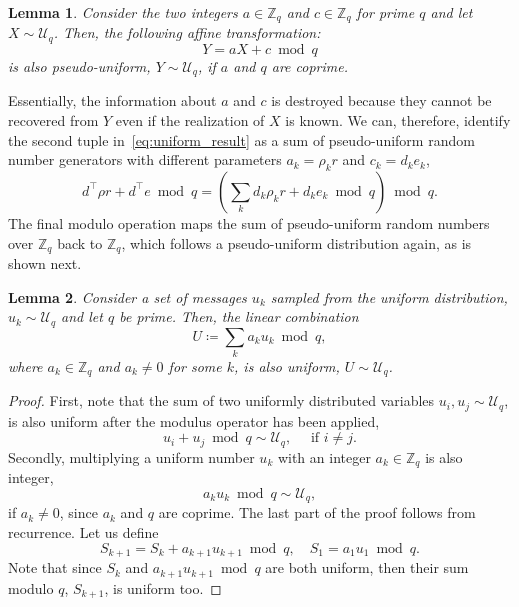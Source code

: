 \documentclass[journal, twoside, web]{ieeecolorpreprint}
\newtheorem{lem}{Lemma}
\begin{document}
\begin{lem}\label{lem:makeUnif}
    Consider the two integers $a\in\mathbb Z_q$ and $c \in \mathbb Z_q$ for prime $q$ and let $X \sim \mathcal{U}_q$. Then, the following affine transformation:
    \begin{equation} \label{eq:uniformize}
        Y= aX+c \bmod q
    \end{equation}
    is also pseudo-uniform, $Y \sim \mathcal{U}_{q}$, if $a$ and $q$ are coprime.
\end{lem}

Essentially, the information about $a$ and $c$ is destroyed because they cannot be recovered from $Y$ even if the realization of $X$ is known. We can, therefore, identify the second tuple in~\eqref{eq:uniform_result} as a sum of pseudo-uniform random number generators with different parameters $a_k=\rho_kr$ and $c_k=d_ke_k$,
\begin{equation*}
   d^\top \rho r + d^\top e \bmod q =  \left ( \sum \limits_k d_k\rho_kr + d_ke_k \bmod q \right) \bmod q.
\end{equation*}
The final modulo operation maps the sum of pseudo-uniform random numbers over $\mathbb Z_q$ back to $\mathbb Z_q$, which follows a pseudo-uniform distribution again, as is shown next.
\begin{lem}
\label{lem:sum_pseudo_unif}    Consider a set of messages $u_k$ sampled from the uniform distribution, $u_k \sim \mathcal{U}_{q}$ and let $q$ be prime. Then, the linear combination
    \begin{equation*}
        U \coloneqq \sum \limits_k a_k u_k \bmod q,
    \end{equation*}
    where $a_k \in \mathbb Z_q$ and $a_k \neq 0$ for some $k$, is also uniform, $U \sim  \mathcal{U}_{q}$.
\end{lem}
\begin{proof}
    First, note that the sum of two uniformly distributed variables $u_i, u_j \sim  \mathcal{U}_{q}$, is also uniform after the modulus operator has been applied,
    \begin{equation*}
        u_i+u_j \bmod q \sim  \mathcal{U}_{q}, \quad \text{ if } i\neq j.
    \end{equation*}
    Secondly, multiplying a uniform number $u_k$ with an integer $a_k \in \mathbb Z_q$ is also integer,
    \begin{equation*}
        a_k u_k \bmod q \sim  \mathcal{U}_{q},
    \end{equation*}
    if $a_k \neq 0$, since $a_k$ and $q$ are coprime. The last part of the proof follows from recurrence. Let us define
    \begin{equation*}
        S_{k+1} = S_k + a_{k+1}u_{k+1} \bmod q, \quad S_1 = a_1u_1 \bmod q.
    \end{equation*}
Note that since $S_k$ and $a_{k+1}u_{k+1} \bmod q$ are both uniform, then their sum modulo $q$, $S_{k+1}$, is uniform too.
\end{proof}
\end{document}

